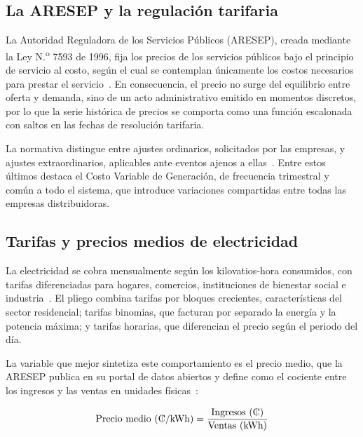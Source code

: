 \documentclass[conference]{IEEEtran}
\newcommand{\crc}{\textcolonmonetary} %
\begin{document}
\subsection{La ARESEP y la regulaci\'on tarifaria}
\label{sec:aresep}

La Autoridad Reguladora de los Servicios P\'ublicos (ARESEP), creada mediante la Ley N.\textsuperscript{o} 7593 de 1996, fija los precios de los servicios p\'ublicos bajo el principio de servicio al costo, seg\'un el cual se contemplan \'unicamente los costos necesarios para prestar el servicio~\cite{r3}. En consecuencia, el precio no surge del equilibrio entre oferta y demanda, sino de un acto administrativo emitido en momentos discretos, por lo que la serie hist\'orica de precios se comporta como una funci\'on escalonada con saltos en las fechas de resoluci\'on tarifaria.

La normativa distingue entre ajustes ordinarios, solicitados por las empresas, y ajustes extraordinarios, aplicables ante eventos ajenos a ellas~\cite{r4}. Entre estos \'ultimos destaca el Costo Variable de Generaci\'on, de frecuencia trimestral y com\'un a todo el sistema, que introduce variaciones compartidas entre todas las empresas distribuidoras.

\subsection{Tarifas y precios medios de electricidad}

La electricidad se cobra mensualmente seg\'un los kilovatios-hora consumidos, con tarifas diferenciadas para hogares, comercios, instituciones de bienestar social e industria~\cite{r5}. El pliego combina tarifas por bloques crecientes, caracter\'isticas del sector residencial; tarifas binomias, que facturan por separado la energ\'ia y la potencia m\'axima; y tarifas horarias, que diferencian el precio seg\'un el periodo del d\'ia.

La variable que mejor sintetiza este comportamiento es el precio medio, que la ARESEP publica en su portal de datos abiertos y define como el cociente entre los ingresos y las ventas en unidades f\'isicas~\cite{r6}:

\begin{equation}
\text{Precio medio (\crc/kWh)} = \frac{\text{Ingresos (\crc)}}{\text{Ventas (kWh)}}
\label{eq:precio_medio}
\end{equation}
\end{document}
